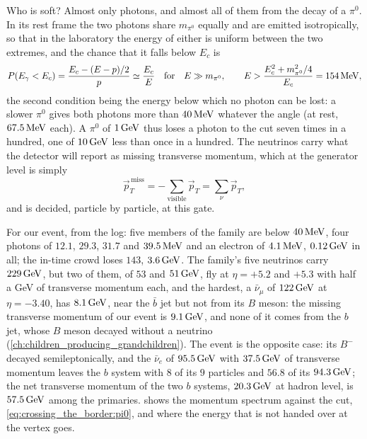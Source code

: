 Who is soft? Almost only photons, and almost all of them from the decay of a
$\pi^0$. In its rest frame the two photons share $m_{\pi^0}$ equally and are
emitted isotropically, so that in the laboratory the energy of either is
uniform between the two extremes, and the chance that it falls below $E_c$ is
\begin{equation}
  P(E_\gamma<E_c)=\frac{E_c-(E-p)/2}{p}\simeq\frac{E_c}{E}
  \quad\text{for}\quad E\gg m_{\pi^0},
  \qquad
  E>\frac{E_c^2+m_{\pi^0}^2/4}{E_c}=154\,\mathrm{MeV} ,
  \label{eq:crossing_the_border:pi0}
\end{equation}
the second condition being the energy below which no photon can be lost:
a slower $\pi^0$ gives both photons more than $40\,\mathrm{MeV}$ whatever the angle
(at rest, $67.5\,\mathrm{MeV}$ each). A $\pi^0$ of $1\,\mathrm{GeV}$ thus loses a photon to the cut
seven times in a hundred, one of $10\,\mathrm{GeV}$ less than once in a hundred. The
neutrinos carry what the detector will report as missing transverse
momentum, which at the generator level is simply
\begin{equation}
  \vec p_T^{\,\mathrm{miss}}=-\sum_{\text{visible}}\vec p_T=\sum_{\nu}\vec p_T ,
  \label{eq:crossing_the_border:met}
\end{equation}
and is decided, particle by particle, at this gate.

For our event, from the  log: five members of the family are below
$40\,\mathrm{MeV}$, four photons of $12.1$, $29.3$, $31.7$ and $39.5\,\mathrm{MeV}$ and an electron
of $4.1\,\mathrm{MeV}$, $0.12\,\mathrm{GeV}$ in all; the in-time crowd loses $143$, $3.6\,\mathrm{GeV}$. The
family's five neutrinos carry $229\,\mathrm{GeV}$, but two of them, of $53$ and
$51\,\mathrm{GeV}$, fly at $\eta=+5.2$ and $+5.3$ with half a GeV of transverse
momentum each, and the hardest, a $\bar\nu_\mu$ of $122\,\mathrm{GeV}$ at $\eta=-3.40$,
has $8.1\,\mathrm{GeV}$, near the $\bar b$ jet but not from its $B$ meson: the missing
transverse momentum of our event is $9.1\,\mathrm{GeV}$, and none of it comes from
the $b$ jet, whose $B$ meson decayed without a neutrino
(\cref{ch:children_producing_grandchildren}). The \CMSSW event is the opposite case: its $B^-$
decayed semileptonically, and the $\bar\nu_e$ of $95.5\,\mathrm{GeV}$ with $37.5\,\mathrm{GeV}$ of
transverse momentum leaves the $b$ system with $8$ of its $9$ particles and
$56.8$ of its $94.3\,\mathrm{GeV}$; the net transverse momentum of the two $b$ systems,
$20.3\,\mathrm{GeV}$ at hadron level, is $57.5\,\mathrm{GeV}$ among the primaries.
 shows the momentum spectrum against
the cut, \cref{eq:crossing_the_border:pi0}, and where the energy that is not
handed over at the vertex goes.

